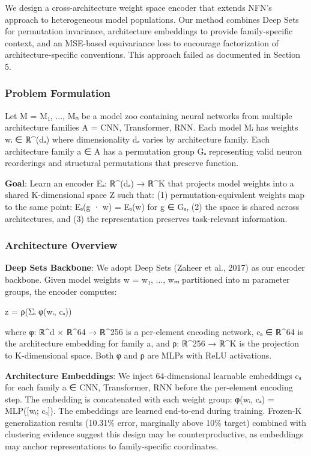 
We design a cross-architecture weight space encoder that extends NFN's approach to heterogeneous model populations. Our method combines Deep Sets for permutation invariance, architecture embeddings to provide family-specific context, and an MSE-based equivariance loss to encourage factorization of architecture-specific conventions. This approach failed as documented in Section 5.

\subsubsection{Problem Formulation}

Let M = {M₁, ..., Mₙ} be a model zoo containing neural networks from multiple architecture families A = {CNN, Transformer, RNN}. Each model Mᵢ has weights wᵢ ∈ ℝ^(dₐ) where dimensionality dₐ varies by architecture family. Each architecture family a ∈ A has a permutation group Gₐ representing valid neuron reorderings and structural permutations that preserve function.

\textbf{Goal}: Learn an encoder Eₐ: ℝ^(dₐ) → ℝ^K that projects model weights into a shared K-dimensional space Z such that: (1) permutation-equivalent weights map to the same point: Eₐ(g · w) = Eₐ(w) for g ∈ Gₐ, (2) the space is shared across architectures, and (3) the representation preserves task-relevant information.

\subsubsection{Architecture Overview}

\textbf{Deep Sets Backbone}: We adopt Deep Sets (Zaheer et al., 2017) as our encoder backbone. Given model weights w = {w₁, ..., wₘ} partitioned into m parameter groups, the encoder computes:

z = ρ(Σᵢ φ(wᵢ, cₐ))

where φ: ℝ^d × ℝ^64 → ℝ^256 is a per-element encoding network, cₐ ∈ ℝ^64 is the architecture embedding for family a, and ρ: ℝ^256 → ℝ^K is the projection to K-dimensional space. Both φ and ρ are MLPs with ReLU activations.

\textbf{Architecture Embeddings}: We inject 64-dimensional learnable embeddings cₐ for each family a ∈ {CNN, Transformer, RNN} before the per-element encoding step. The embedding is concatenated with each weight group: φ(wᵢ, cₐ) = MLP([wᵢ; cₐ]). The embeddings are learned end-to-end during training. Frozen-K generalization results (10.31\% error, marginally above 10\% target) combined with clustering evidence suggest this design may be counterproductive, as embeddings may anchor representations to family-specific coordinates.

